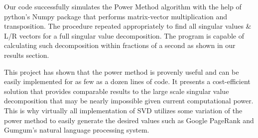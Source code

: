 \documentclass[12pt]{article}
\begin{document}
\hspace{+24pt}Our code successfully simulates the Power Method algorithm with the help of python's Numpy package that performs matrix-vector multiplication and transposition. The procedure repeated appropriately to find all singular values \& L/R vectors for a full singular value decomposition. The program is capable of calculating such decomposition within fractions of a second as shown in our results section.

\hspace{+24pt}This project has shown that the power method is provenly useful and can be easily implemented for as few as a dozen lines of code. It presents a cost-efficient solution that provides comparable results to the large scale singular value decomposition that may be nearly impossible given current computational power. This is why virtually all implementation of SVD utilizes some variation of the power method to easily generate the desired values such as Google PageRank and Gumgum's natural language processing system. 
\end{document}
